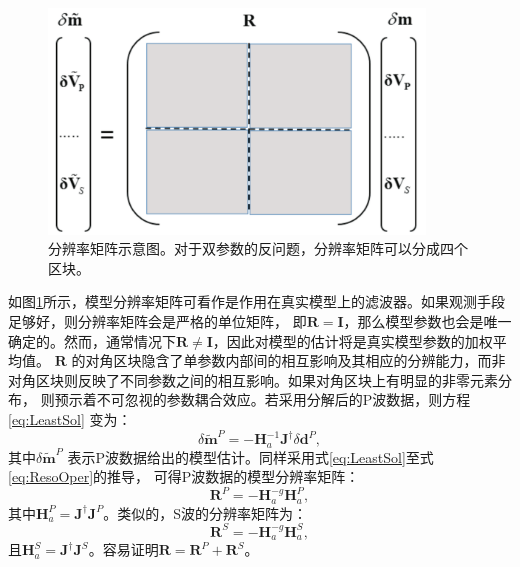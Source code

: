 \begin{figure}
    \begin{center}
        \includegraphics[width=10cm]{Figure/chapter02/ResoOpera/Fig/resolutionmatrix.pdf}
        \caption{
			分辨率矩阵示意图。对于双参数的反问题，分辨率矩阵可以分成四个区块。
    }
    \label{fig:IllustrReso}
    \end{center}
\end{figure}
如图\ref{fig:IllustrReso}所示，模型分辨率矩阵可看作是作用在真实模型上的滤波器。如果观测手段足够好，则分辨率矩阵会是严格的单位矩阵，
即$\mathbf{R}=\mathbf{I}$，那么模型参数也会是唯一确定的。然而，通常情况下$\mathbf{R} \ne \mathbf{I}$，因此对模型的估计将是真实模型参数的加权平均值。
$\mathbf{R}$ 的对角区块隐含了单参数内部间的相互影响及其相应的分辨能力，而非对角区块则反映了不同参数之间的相互影响。如果对角区块上有明显的非零元素分布，
则预示着不可忽视的参数耦合效应。若采用分解后的P波数据，则方程\eqref{eq:LeastSol} 变为：
\begin{equation}
        \delta \tilde{\mathbf{m}}^P=-\mathbf{H}^{-1}_a\mathbf{J}^{\dagger}\delta \mathbf{d}^P,
        \label{eq:LeastSolP}
\end{equation}
其中$\delta \tilde{\mathbf{m}}^P$ 表示P波数据给出的模型估计。同样采用式\eqref{eq:LeastSol}至式\eqref{eq:ResoOper}的推导，
可得P波数据的模型分辨率矩阵：
\begin{equation}
        \mathbf{R}^P=-\mathbf{H}^{-g}_a\mathbf{H}_a^P,
        \label{eq:ResoOperP}
\end{equation}
其中$\mathbf{H}_a^P=\mathbf{J}^{\dagger}\mathbf{J}^P$。类似的，S波的分辨率矩阵为：
\begin{equation}
        \mathbf{R}^S=-\mathbf{H}^{-g}_a\mathbf{H}_a^S,
        \label{eq:ResoOperS}
\end{equation}
且$\mathbf{H}_a^S=\mathbf{J}^{\dagger}\mathbf{J}^S$。容易证明$\mathbf{R}=\mathbf{R}^P+\mathbf{R}^S$。

